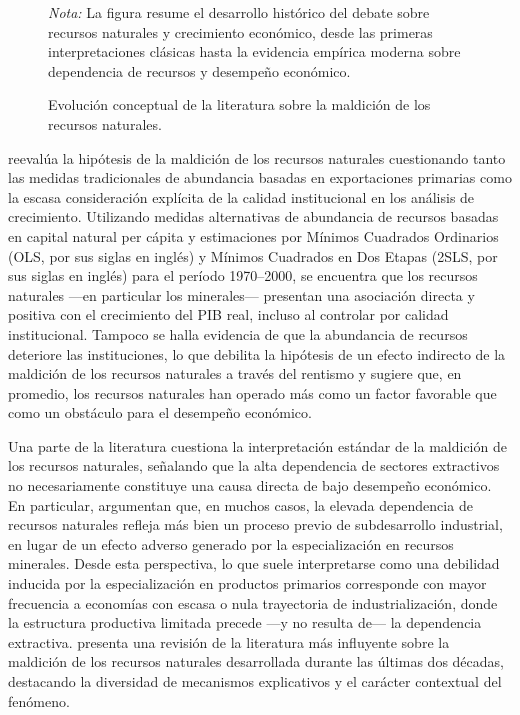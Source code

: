 \documentclass[../../TFM.tex]{subfiles}
\begin{document}
\begin{figure}[htbp]
{\begin{tikzpicture}
			\end{tikzpicture}
		}
		\caption[Evolución de la literatura sobre la maldición de los recursos]{Evolución conceptual de la literatura sobre la maldición de los recursos naturales.}
		\label{fig:resource_curse_timeline}
		\begin{minipage}{\linewidth}
			\vspace{1ex}
			\footnotesize
			\textit{Nota:} La figura resume el desarrollo histórico del debate sobre recursos naturales y crecimiento económico, desde las primeras interpretaciones clásicas hasta la evidencia empírica moderna sobre dependencia de recursos y desempeño económico.
			\vspace{1ex}
			
		\end{minipage}
	\end{figure}
	
	\textcite{Brunnschweiler2006} reevalúa la hipótesis de la maldición de los recursos naturales cuestionando tanto las medidas tradicionales de abundancia basadas en exportaciones primarias como la escasa consideración explícita de la calidad institucional en los análisis de crecimiento. Utilizando medidas alternativas de abundancia de recursos basadas en capital natural per cápita y estimaciones por Mínimos Cuadrados Ordinarios (OLS, por sus siglas en inglés) y Mínimos Cuadrados en Dos Etapas (2SLS, por sus siglas en inglés) para el período 1970–2000, se encuentra que los recursos naturales —en particular los minerales— presentan una asociación directa y positiva con el crecimiento del PIB real, incluso al controlar por calidad institucional. Tampoco se halla evidencia de que la abundancia de recursos deteriore las instituciones, lo que debilita la hipótesis de un efecto indirecto de la maldición de los recursos naturales a través del rentismo y sugiere que, en promedio, los recursos naturales han operado más como un factor favorable que como un obstáculo para el desempeño económico.
	
	Una parte de la literatura cuestiona la interpretación estándar de la maldición de los recursos naturales, señalando que la alta dependencia de sectores extractivos no necesariamente constituye una causa directa de bajo desempeño económico. En particular, \textcite{Morris2013} argumentan que, en muchos casos, la elevada dependencia de recursos naturales refleja más bien un proceso previo de subdesarrollo industrial, en lugar de un efecto adverso generado por la especialización en recursos minerales. Desde esta perspectiva, lo que suele interpretarse como una debilidad inducida por la especialización en productos primarios corresponde con mayor frecuencia a economías con escasa o nula trayectoria de industrialización, donde la estructura productiva limitada precede —y no resulta de— la dependencia extractiva. \textcite{Papyrakis2017} presenta una revisión de la literatura más influyente sobre la maldición de los recursos naturales desarrollada durante las últimas dos décadas, destacando la diversidad de mecanismos explicativos y el carácter contextual del fenómeno.
	
\end{document}
